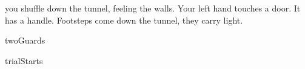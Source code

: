 you shuffle down the tunnel, feeling the walls.
Your left hand touches a door.
It has a handle.
Footsteps come down the tunnel, they carry light.

\begin{selectPath}
  {}%
  {twoGuards}

  {}%
  {trialStarts}
\end{selectPath}
